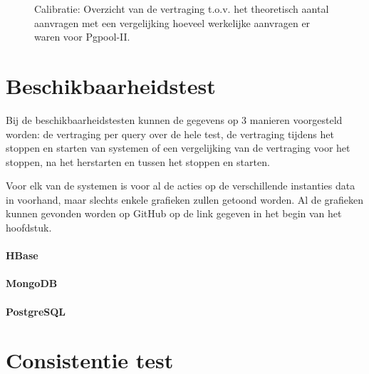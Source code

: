 \begin{figure}[h!] 
	\centering
	\caption{Calibratie: Overzicht van de vertraging t.o.v. het theoretisch aantal aanvragen met een vergelijking hoeveel werkelijke aanvragen er waren voor Pgpool-II. }
	\label{fig:calibratie-queriesperseconde-pgpool-ii}
\end{figure}

\section{Beschikbaarheidstest}
Bij de beschikbaarheidstesten kunnen de gegevens op 3 manieren voorgesteld worden: de vertraging per query over de hele test, de vertraging tijdens het stoppen en starten van systemen of een vergelijking van de vertraging voor het stoppen, na het herstarten en tussen het stoppen en starten. 

Voor elk van de systemen is voor al de acties op de verschillende instanties data in voorhand, maar slechts enkele grafieken zullen getoond worden. Al de grafieken kunnen gevonden worden op GitHub op de link gegeven in het begin van het hoofdstuk. 

\paragraph{HBase} \todo{}

\paragraph{MongoDB} \todo{}

\paragraph{PostgreSQL} \todo{}

\section{Consistentie test}
